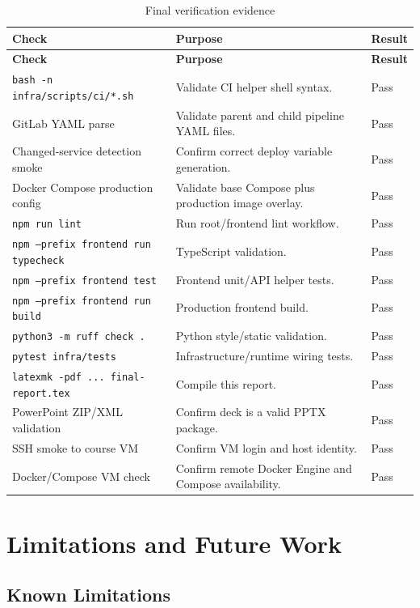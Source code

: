 \documentclass[12pt,a4paper]{report}
\begin{document}
\begin{longtable}{L{0.42\textwidth}L{0.42\textwidth}C{0.10\textwidth}}
\caption{Final verification evidence}\label{tab:verification}\\
\toprule
\textbf{Check} & \textbf{Purpose} & \textbf{Result} \\
\midrule
\endfirsthead
\toprule
\textbf{Check} & \textbf{Purpose} & \textbf{Result} \\
\midrule
\endhead
\texttt{bash -n infra/scripts/ci/*.sh} & Validate CI helper shell syntax. & Pass \\
GitLab YAML parse & Validate parent and child pipeline YAML files. & Pass \\
Changed-service detection smoke & Confirm correct deploy variable generation. & Pass \\
Docker Compose production config & Validate base Compose plus production image overlay. & Pass \\
\texttt{npm run lint} & Run root/frontend lint workflow. & Pass \\
\texttt{npm --prefix frontend run typecheck} & TypeScript validation. & Pass \\
\texttt{npm --prefix frontend test} & Frontend unit/API helper tests. & Pass \\
\texttt{npm --prefix frontend run build} & Production frontend build. & Pass \\
\texttt{python3 -m ruff check .} & Python style/static validation. & Pass \\
\texttt{pytest infra/tests} & Infrastructure/runtime wiring tests. & Pass \\
\texttt{latexmk -pdf ... final-report.tex} & Compile this report. & Pass \\
PowerPoint ZIP/XML validation & Confirm deck is a valid PPTX package. & Pass \\
SSH smoke to course VM & Confirm VM login and host identity. & Pass \\
Docker/Compose VM check & Confirm remote Docker Engine and Compose availability. & Pass \\
\bottomrule
\end{longtable}

\chapter{Limitations and Future Work}
\label{ch:limitations}

\section{Known Limitations}
\label{sec:known-limitations}
\end{document}
